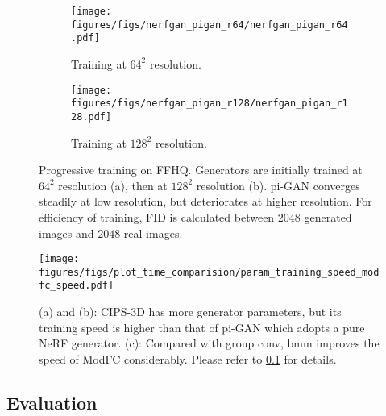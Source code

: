 \documentclass[10pt,twocolumn,letterpaper]{article}
\begin{document}
\begin{figure}[!t]
  \begin{subfigure}[]{0.49\linewidth}
    \centering
    \captionsetup{justification=centering,margin=0cm}
    \texttt{[image: figures/figs/nerfgan\_pigan\_r64/nerfgan\_pigan\_r64.pdf]}
\caption{Training at $64^2$ resolution.}
    \label{fig:sub:progressive_64}
  \end{subfigure}\hspace{0.01\linewidth}
  \begin{subfigure}[]{0.49\linewidth}
    \centering
    \captionsetup{justification=centering,margin=0cm}
    \texttt{[image: figures/figs/nerfgan\_pigan\_r128/nerfgan\_pigan\_r128.pdf]}
\caption{Training at $128^2$ resolution.}
    \label{fig:sub:progressive_128}
  \end{subfigure}
  \vspace{-0.3cm}
  \caption{Progressive training on FFHQ. Generators are initially trained at $64^2$ resolution (a), then at $128^2$ resolution (b). pi-GAN converges steadily at low resolution, but deteriorates at higher resolution. For efficiency of training, FID is calculated between $2048$ generated images and $2048$ real images.}
  \label{fig:progressive_training}
  \vspace{-0.3cm}
\end{figure}

\begin{figure}[!t]
  \centering
  \texttt{[image: figures/figs/plot\_time\_comparision/param\_training\_speed\_modfc\_speed.pdf]}
\vspace{-0.3cm}
  \caption{(a) and (b): CIPS-3D has more generator parameters, but its training speed is higher than that of pi-GAN which adopts a pure NeRF generator. (c): Compared with group conv, $\mathrm{bmm}$ improves the speed of ModFC considerably. Please refer to \cref{sec:exp:evaluation} for details.}
  \label{fig:params_speed}
  \vspace{-0.5cm}
\end{figure}


\subsection{Evaluation}
\label{sec:exp:evaluation}
\end{document}
